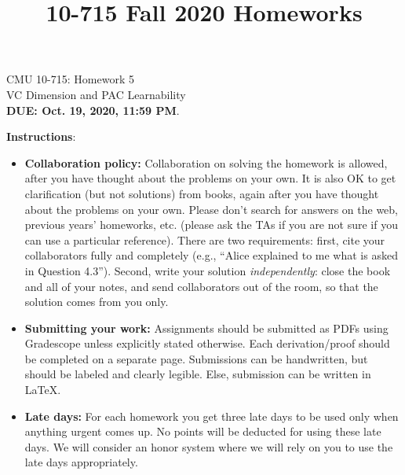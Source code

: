 \documentclass{article}
\title{10-715 Fall 2020 Homeworks}
\begin{document}

\begin{center}
{\Large CMU 10-715: Homework 5}\\
VC Dimension and PAC Learnability \\
{\bf DUE: Oct. 19, 2020, 11:59 PM}.\\
\end{center}


\textbf{\large Instructions}:
\begin{itemize}
    \item \textbf{Collaboration policy:} Collaboration on solving the homework is allowed, after you have thought about the problems on your own. It is also OK to get clarification (but not solutions) from books, again after you have thought about the problems on your own. Please don’t search for answers on the web, previous years’ homeworks, etc. (please ask the TAs if you are not sure if you can use a particular reference). There are two requirements: first, cite your collaborators fully and completely (e.g., ``Alice explained to me what is asked in Question 4.3''). Second, write your solution \emph{independently}: close the book and all of your notes, and send collaborators out of the room, so that the solution comes from you only. 
    \item \textbf{Submitting your work:} Assignments should be submitted as PDFs using Gradescope unless explicitly stated otherwise. Each derivation/proof should be completed on a separate page. Submissions can be handwritten, but should be labeled and clearly legible. Else, submission can be written in LaTeX.
    
    \item \textbf{Late days:} For each homework you get three late days to be used only when anything urgent comes up. No points will be deducted for using these late days. We will consider an honor system where we will rely on you to use the late days appropriately.
    

\end{itemize}
\end{document}
